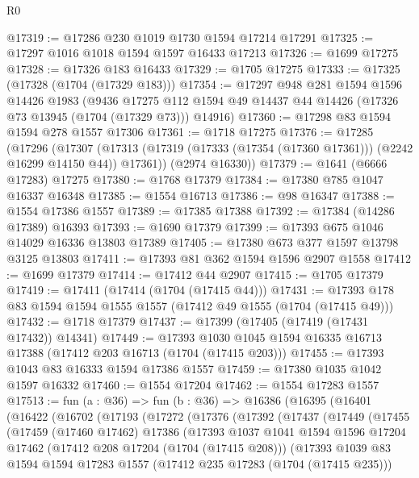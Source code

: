 \begin{lexlean}{R0}
\begin{coremodule}
@17319 := @17286 @230 @1019 @1730 @1594 @17214 @17291
@17325 := @17297 @1016 @1018 @1594 @1597 @16433 @17213
@17326 := @1699 @17275
@17328 := @17326 @183 @16433
@17329 := @1705 @17275
@17333 := @17325 (@17328 (@1704 (@17329 @183)))
@17354 := @17297
    @948
    @281
    @1594
    @1596
    @14426
    @1983
    (@9436 @17275 @112 @1594 @49 @14437 @44 @14426 (@17326 @73 @13945 (@1704 (@17329 @73))) @14916)
@17360 := @17298 @83 @1594 @1594 @278 @1557 @17306
@17361 := @1718 @17275
@17376 := @17285
    (@17296
      (@17307 (@17313 (@17319 (@17333 (@17354 (@17360 @17361))) (@2242 @16299 @14150 @44)) @17361))
      (@2974 @16330))
@17379 := @1641 (@6666 @17283) @17275
@17380 := @1768 @17379
@17384 := @17380 @785 @1047 @16337 @16348
@17385 := @1554 @16713
@17386 := @98 @16347
@17388 := @1554 @17386 @1557
@17389 := @17385 @17388
@17392 := @17384 (@14286 @17389) @16393
@17393 := @1690 @17379
@17399 := @17393 @675 @1046 @14029 @16336 @13803 @17389
@17405 := @17380 @673 @377 @1597 @13798 @3125 @13803
@17411 := @17393 @81 @362 @1594 @1596 @2907 @1558
@17412 := @1699 @17379
@17414 := @17412 @44 @2907
@17415 := @1705 @17379
@17419 := @17411 (@17414 (@1704 (@17415 @44)))
@17431 := @17393 @178 @83 @1594 @1594 @1555 @1557 (@17412 @49 @1555 (@1704 (@17415 @49)))
@17432 := @1718 @17379
@17437 := @17399 (@17405 (@17419 (@17431 @17432)) @14341)
@17449 := @17393 @1030 @1045 @1594 @16335 @16713 @17388 (@17412 @203 @16713 (@1704 (@17415 @203)))
@17455 := @17393 @1043 @83 @16333 @1594 @17386 @1557
@17459 := @17380 @1035 @1042 @1597 @16332
@17460 := @1554 @17204
@17462 := @1554 @17283 @1557
@17513 := fun (a : @36) =>
  fun (b : @36) =>
  @16386
    (@16395
      (@16401
        (@16422
          (@16702
            (@17193
              (@17272
                (@17376
                  (@17392
                    (@17437
                      (@17449
                        (@17455
                          (@17459
                            (@17460 @17462)
                            @17386
                            (@17393
                              @1037
                              @1041
                              @1594
                              @1596
                              @17204
                              @17462
                              (@17412 @208 @17204 (@1704 (@17415 @208)))
                              (@17393
                                @1039
                                @83
                                @1594
                                @1594
                                @17283
                                @1557
                                (@17412 @235 @17283 (@1704 (@17415 @235)))

\end{coremodule}
\end{lexlean}
